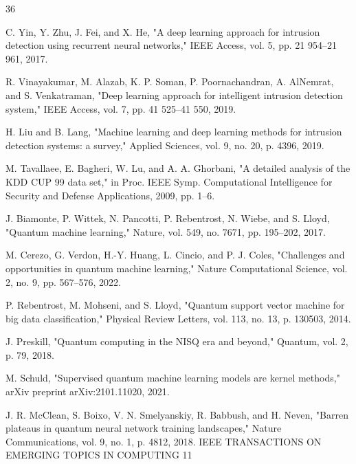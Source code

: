 %
\begin{thebibliography}{36}

C. Yin, Y. Zhu, J. Fei, and X. He, "A deep learning approach for intrusion detection using recurrent neural networks," IEEE Access, vol. 5, pp. 21 954--21 961, 2017.

R. Vinayakumar, M. Alazab, K. P. Soman, P. Poornachandran, A. AlNemrat, and S. Venkatraman, "Deep learning approach for intelligent intrusion detection system," IEEE Access, vol. 7, pp. 41 525--41 550, 2019.

H. Liu and B. Lang, "Machine learning and deep learning methods for intrusion detection systems: a survey," Applied Sciences, vol. 9, no. 20, p. 4396, 2019.

M. Tavallaee, E. Bagheri, W. Lu, and A. A. Ghorbani, "A detailed analysis of the KDD CUP 99 data set," in Proc. IEEE Symp. Computational Intelligence for Security and Defense Applications, 2009, pp. 1--6.

J. Biamonte, P. Wittek, N. Pancotti, P. Rebentrost, N. Wiebe, and S. Lloyd, "Quantum machine learning," Nature, vol. 549, no. 7671, pp. 195--202, 2017.

M. Cerezo, G. Verdon, H.-Y. Huang, L. Cincio, and P. J. Coles, "Challenges and opportunities in quantum machine learning," Nature Computational Science, vol. 2, no. 9, pp. 567--576, 2022.

P. Rebentrost, M. Mohseni, and S. Lloyd, "Quantum support vector machine for big data classification," Physical Review Letters, vol. 113, no. 13, p. 130503, 2014.

J. Preskill, "Quantum computing in the NISQ era and beyond," Quantum, vol. 2, p. 79, 2018.

M. Schuld, "Supervised quantum machine learning models are kernel methods," arXiv preprint arXiv:2101.11020, 2021.

J. R. McClean, S. Boixo, V. N. Smelyanskiy, R. Babbush, and H. Neven, "Barren plateaus in quantum neural network training landscapes," Nature Communications, vol. 9, no. 1, p. 4812, 2018. IEEE TRANSACTIONS ON EMERGING TOPICS IN COMPUTING 11


\end{thebibliography}
